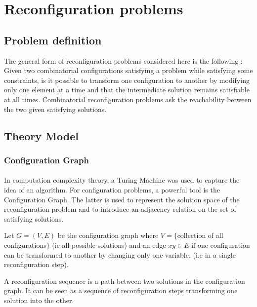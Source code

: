 \section{Reconfiguration problems}
\label{sec:reconfigureIntro}

\subsection{Problem definition}
\begin{defn}
The general form of reconfiguration problems considered here is the following : Given two combinatorial configurations satisfying a problem while satisfying some constraints, is it possible to transform one configuration to another by modifying only one element at a time and that the intermediate solution remains satisfiable at all times. Combinatorial reconfiguration problems ask the reachability between the two given satisfying solutions. 
\end{defn}

\subsection{Theory Model}
\subsubsection{Configuration Graph}
\paragraph{}In computation complexity theory, a Turing Machine was used to capture the idea of an algorithm. For configuration problems, a powerful tool is the Configuration Graph. The latter is used to represent the solution space of the reconfiguration problem and to introduce an adjacency relation on the set of satisfying solutions. 

\begin{defn}
Let $G = (V,E)$ be the configuration graph where $V = \{$collection of all configurations$\}$ (ie all possible solutions) and an edge $xy \in E$ if one configuration can be transformed to another by changing only one variable. (i.e in a single reconfiguration step). 
\end{defn}

\begin{defn}
A reconfiguration sequence is a path between two solutions in the configuration graph. It can be seen as a sequence of reconfiguration steps transforming one solution into the other.
\end{defn}


